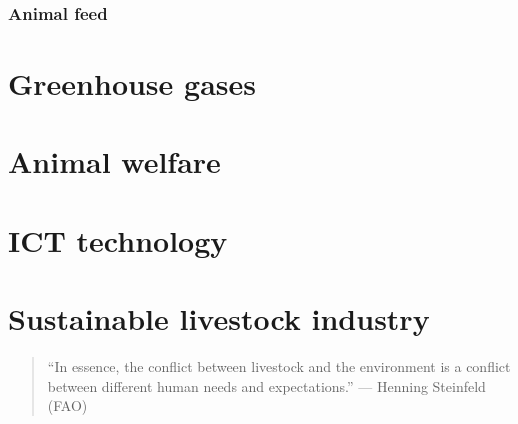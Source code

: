 \documentclass[]{book}
\begin{document}
\subsection{Animal feed}\label{animal-feed}

\chapter{Greenhouse gases}\label{greenhouse-gases}

\chapter{Animal welfare}\label{animal-welfare}

\chapter{ICT technology}\label{ict-technology}

\chapter{Sustainable livestock
industry}\label{sustainable-livestock-industry}

\begin{quote}
``In essence, the conflict between livestock and the environment is a
conflict between different human needs and expectations.'' --- Henning
Steinfeld (FAO)
\end{quote}


\end{document}
